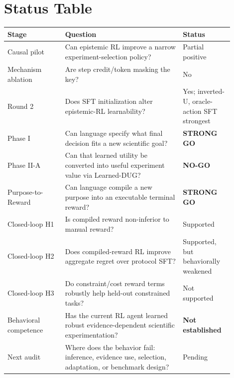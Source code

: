 \documentclass[11pt]{article}
\begin{document}
\section{Status Table}
\begin{center}
\small
\begin{tabular}{p{0.23\linewidth}p{0.47\linewidth}p{0.20\linewidth}}
\toprule
Stage & Question & Status\\
\midrule
Causal pilot & Can epistemic RL improve a narrow experiment-selection policy? & Partial positive\\
Mechanism ablation & Are step credit/token masking the key? & No\\
Round 2 & Does SFT initialization alter epistemic-RL learnability? & Yes; inverted-U, oracle-action SFT strongest\\
Phase I & Can language specify what final decision fits a new scientific goal? & \textbf{STRONG GO}\\
Phase II-A & Can that learned utility be converted into useful experiment value via Learned-DUG? & \textbf{NO-GO}\\
Purpose-to-Reward & Can language compile a new purpose into an executable terminal reward? & \textbf{STRONG GO}\\
Closed-loop H1 & Is compiled reward non-inferior to manual reward? & Supported\\
Closed-loop H2 & Does compiled-reward RL improve aggregate regret over protocol SFT? & Supported, but behaviorally weakened\\
Closed-loop H3 & Do constraint/cost reward terms robustly help held-out constrained tasks? & Not supported\\
Behavioral competence & Has the current RL agent learned robust evidence-dependent scientific experimentation? & \textbf{Not established}\\
Next audit & Where does the behavior fail: inference, evidence use, selection, adaptation, or benchmark design? & Pending\\
\bottomrule
\end{tabular}
\end{center}
\end{document}

